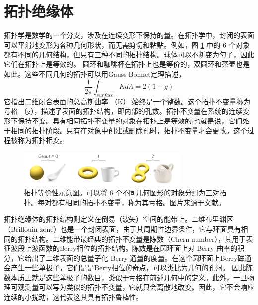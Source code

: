 \section{拓扑绝缘体}
拓扑学是数学的一个分支，涉及在连续变形下保持的量。在拓扑学中，封闭的表面可以平滑地变形为各种几何形状，而无需剪切和粘贴。例如，图 \ref{fig:TopoGeo} 中的 6 个对象都有不同的几何结构，但只有三种不同的拓扑结构。球体可以不断变为勺子，因此它们在拓扑上是等效的。
圆环和咖啡杯在拓扑上也是等价的，双圆环和茶壶也是如此。这些不同几何的拓扑可以用Gauss-Bonnet定理描述，
\begin{equation}
	\frac{1}{2\pi}\int_{surface}KdA=2(1-g)
\end{equation}
它指出二维闭合表面的总高斯曲率 （K） 始终是一个整数。这个拓扑不变量称为亏格 （g），描述了表面的拓扑结构，即内部的孔数。拓扑不变量在系统的连续变形下保持不变。具有相同拓扑不变量的对象在拓扑上是等效的;也就是说，它们处于相同的拓扑阶段。只有在对象中创建或删除孔时，拓扑不变量才会更改。这个过程被称为拓扑相变。

\begin{figure}[htbp]
	\centering
	\includegraphics[width=0.75\textwidth]{figure/Introduction/TopoGeo.png}
 \caption{拓扑等价性示意图。可以将 6 个不同几何图形的对象分组为三对拓扑。每对都有相同的拓扑不变量，称为其亏格。图片来源于文献\cite{lu2014topological}。}
 \label{fig:TopoGeo}
\end{figure}

拓扑绝缘体的拓扑结构则定义在倒易（波矢）空间的能带上。二维布里渊区（Brillouin zone）也是一个封闭表面，由于其周期性边界条件，它与环面具有相同的拓扑结构。二维能带最经典的拓扑不变量是陈数（Chern number），其用于表征波段上波函数的Berry相位的拓扑结构。陈数是在圆环面上对 Berry 曲率的积分，它给出了二维表面的总量子化 Berry 通量的度量。在这个圆环面上Berry磁通会产生一些单极子，它们是是Berry相位的奇点，可以类比为几何的孔洞。
因此陈数本质上就是这些单极子的数目，类似于亏格在前述几何中的定义。此外，一旦物理可观测量可以写为类似的拓扑不变量，它就只会离散地改变。因此，它不会响应连续的小扰动，这代表这其具有拓扑鲁棒性。

